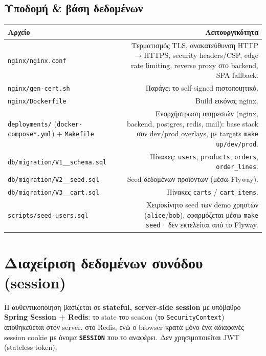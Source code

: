 \documentclass[11pt,a4paper]{article}
\newcommand{\code}[1]{\texttt{#1}}
\begin{document}
\subsection{Υποδομή \& βάση δεδομένων}
\begin{longtable}{@{}L R@{}}
    \toprule
    \textbf{Αρχείο} & \textbf{Λειτουργικότητα} \\
    \midrule
    \code{nginx/nginx.conf} & Τερματισμός TLS, ανακατεύθυνση HTTP$\rightarrow$HTTPS, security headers/CSP, edge rate limiting, reverse proxy στο backend, SPA fallback. \\
    \code{nginx/gen-cert.sh} & Παράγει το self-signed πιστοποιητικό. \\
    \code{nginx/Dockerfile} & Build εικόνας nginx. \\
    \code{deployments/} (\code{docker-compose*.yml}) + \code{Makefile} & Ενορχήστρωση υπηρεσιών (nginx, backend, postgres, redis, mail): base stack συν dev/prod overlays, με targets \code{make up/dev/prod}. \\
    \code{db/migration/V1\_\_schema.sql} & Πίνακες: \code{users}, \code{products}, \code{orders}, \code{order\_lines}. \\
    \code{db/migration/V2\_\_seed.sql} & Seed δεδομένων προϊόντων (μέσω Flyway). \\
    \code{db/migration/V3\_\_cart.sql} & Πίνακες \code{carts} / \code{cart\_items}. \\
    \code{scripts/seed-users.sql} & Χειροκίνητο seed των demo χρηστών (\code{alice}/\code{bob}), εφαρμόζεται μέσω \code{make seed}· δεν εκτελείται από το Flyway. \\
    \bottomrule
\end{longtable}

\section{Διαχείριση δεδομένων συνόδου (session)}
\label{sec:session}

Η αυθεντικοποίηση βασίζεται σε \textbf{stateful, server-side session} με υπόβαθρο
\textbf{Spring Session + Redis}: το state του session (το \code{SecurityContext}) αποθηκεύεται στον
server, στο Redis, ενώ ο browser κρατά μόνο ένα αδιαφανές session cookie με όνομα
\textbf{\code{SESSION}} που το αναφέρει. Δεν χρησιμοποιείται JWT (stateless token).
\end{document}
